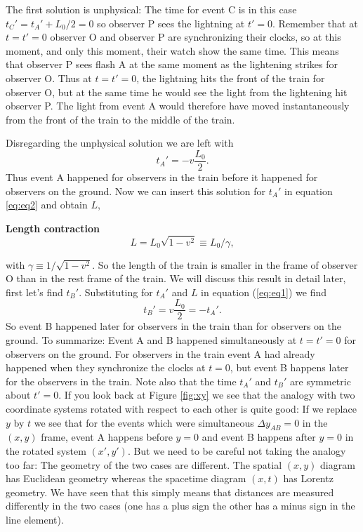 {\begin{multicols}{2}
The first solution is unphysical: The time for event C is in this case $t_C'=t_A'+L_0/2=0$ so observer P sees the lightning at $t'=0$. Remember that at $t=t'=0$ observer O and observer P are synchronizing their clocks, so at this moment, and only this moment, their watch show the same time. This means that observer P sees flash A at the same moment as the lightening strikes for observer O. Thus at $t=t'=0$, the lightning hits the front of the train for observer O, but at the same time he would see the light from the lightening hit observer P. The light from event A would therefore have moved instantaneously from the front of the train to the middle of the train.

Disregarding the unphysical solution we are left with
\[
t_A'=-v\frac{L_0}{2}.
\]
Thus event A happened for observers in the train before it happened for observers on the ground. Now we can insert this solution for $t_A'$ in equation \ref{eq:eq2} and obtain $L$,
\begin{formbox}
\textbf{Length contraction}
\begin{equation}
\label{eq:deltal}
L=L_0\sqrt{1-v^2}\equiv L_0/\gamma,
\end{equation}
\end{formbox}
with $\gamma\equiv1/\sqrt{1-v^2}$. So the length of the train is smaller in the frame of observer O than in the rest frame of the train. We will discuss this result in detail later, first let's find $t_B'$. Substituting for $t_A'$ and $L$ in equation (\ref{eq:eq1}) we find
\[
t_B'=v\frac{L_0}{2}=-t_A'.
\]
So event B happened later for observers in the train than for observers on the ground. To summarize: Event A and B happened simultaneously at $t=t'=0$ for observers on the ground. For observers in the train event A had already happened when they synchronize the clocks at $t=0$, but event B happens later for the observers in the train. Note also that the time $t_A'$ and $t_B'$ are symmetric about $t'=0$. If you look back at Figure \ref{fig:xy} we see that the analogy with two coordinate systems rotated with respect to each other is quite good: If we replace $y$ by $t$ we see that for the events which were simultaneous $\Delta y_{AB}=0$ in the $(x,y)$ frame, event A happens before $y=0$ and event B happens after $y=0$ in the rotated system $(x',y')$. But we need to be careful not taking the analogy too far: The geometry of the two cases are different. The spatial $(x,y)$ diagram has Euclidean geometry whereas the spacetime diagram $(x,t)$ has Lorentz geometry. We have seen that this simply means that distances are measured differently in the two cases (one has a plus sign the other has a minus sign in the line element).


\end{multicols}}
